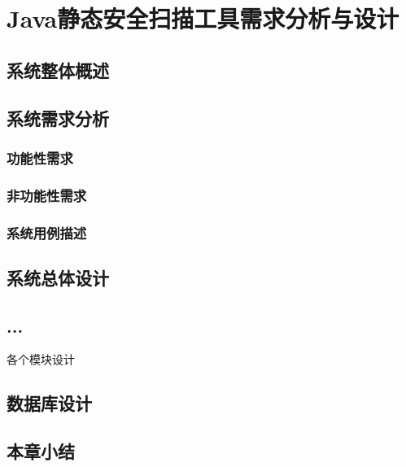 \chapter{Java静态安全扫描工具需求分析与设计}
\section{系统整体概述}

\section{系统需求分析}
\subsection{功能性需求}
\subsection{非功能性需求}
\subsection{系统用例描述}
\section{系统总体设计}

\section{...}
各个模块设计


\section{数据库设计}

\section{本章小结}